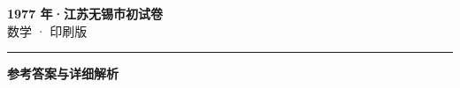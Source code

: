 \documentclass[zihao=5, a4paper]{ctexart}
\begin{document}
\begin{center}
  {\Large\bfseries 1977 年·江苏无锡市初试卷}\\[4pt]
  {\large 数学 · 印刷版}
\end{center}
\medskip
{}

\par\bigskip\hrule\bigskip
{}
\begin{center}{\large\bfseries 参考答案与详细解析}\end{center}
\smallskip

\end{document}

